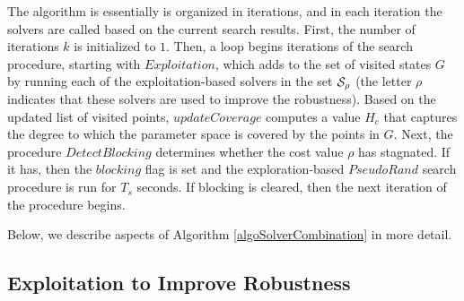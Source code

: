 The algorithm is essentially is organized in iterations, and in each iteration the solvers are called based on the current search results. 
First, the number of iterations $k$ is initialized to $1$. Then, a loop begins iterations of the search procedure, starting with $Exploitation$, which adds to the set of visited states $G$ by running each of the exploitation-based solvers in the set $\mathcal{S_{\rho}}$ (the letter $\rho$ indicates that these solvers are used to improve the robustness). Based on the updated list of visited points, $updateCoverage$ computes a value $H_c$ that captures the degree to which the parameter space is covered by the points in $G$.  Next, the procedure $DetectBlocking$ determines whether the cost value $\rho$ has stagnated. If it has, then the $blocking$ flag is set and the exploration-based $PseudoRand$ search procedure is run for $T_s$ seconds. If blocking is cleared, then the next iteration of the procedure begins.

Below, we describe aspects of Algorithm \ref{algoSolverCombination} in more detail.

\subsection{Exploitation to Improve Robustness}

